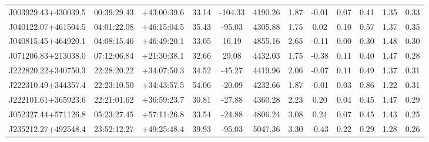 \documentclass[a4paper,fleqn,usenatbib]{mnras}
\begin{document}
\begin{table}
\begin{tabular}{@{}cccccccccccc@{}}
			J003929.43+430039.5 & 00:39:29.43 & +43:00:39.6  & 33.14               	& -104.33             	& 4190.26             	& 1.87           	& -0.01              	& 0.07                   	& 0.41                     	& 1.35             	& 0.33       	\\
			J040122.07+461504.5 & 04:01:22.08 & +46:15:04.5  & 35.43               	& -95.03              	& 4305.88             	& 1.75           	& 0.02               	& 0.10                   	& 0.57                     	& 1.37             	& 0.35       	\\
			J040815.45+464920.1 & 04:08:15.46 & +46:49:20.1  & 33.05               	& 16.19               	& 4855.16             	& 2.65           	& -0.11              	& 0.00                   	& 0.30                     	& 1.48             	& 0.30       	\\
			J071206.83+213038.0 & 07:12:06.84 & +21:30:38.1  & 32.66               	& 29.08               	& 4432.03             	& 1.75           	& -0.38              	& 0.11                   	& 0.40                     	& 1.47             	& 0.28       	\\
			J222820.22+340750.3 & 22:28:20.22 & +34:07:50.3  & 34.52               	& -45.27              	& 4419.96             	& 2.06           	& -0.07              	& 0.11                   	& 0.49                     	& 1.37             	& 0.31       	\\
			J222310.49+344357.4 & 22:23:10.50 & +34:43:57.5  & 54.06               	& -20.09              	& 4232.66             	& 1.87           	& -0.01              	& 0.03                   	& 0.86                     	& 1.22             	& 0.31       	\\
			J222101.61+365923.6 & 22:21:01.62 & +36:59:23.7  & 30.81               	& -27.88              	& 4360.28             	& 2.23           	& 0.20               	& 0.04                   	& 0.45                     	& 1.47             	& 0.29       	\\
			J052327.44+571126.8 & 05:23:27.45 & +57:11:26.8  & 33.54               	& -24.88              	& 4806.24             	& 3.08           	& 0.24               	& 0.07                   	& 0.45                     	& 1.43             	& 0.25       	\\
			J235212.27+492548.4 & 23:52:12.27 & +49:25:48.4  & 39.93               	& -95.03              	& 5047.36             	& 3.30           	& -0.43              	& 0.22                   	& 0.29                     	& 1.28             	& 0.26       	\\

\end{tabular}
\end{table}
\end{document}
